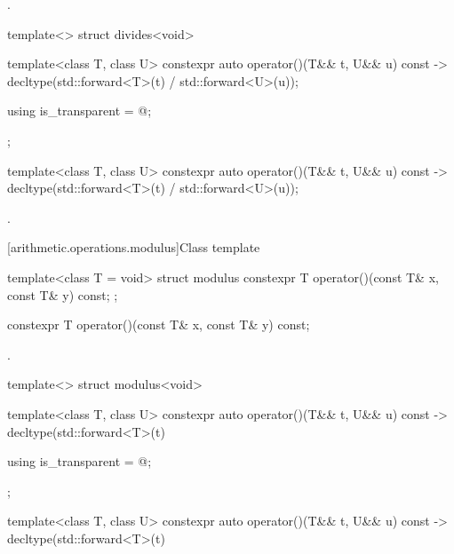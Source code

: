 \begin{itemdescr}
\pnum
\returns
{}.
\end{itemdescr}

%
\begin{itemdecl}
template<> struct divides<void> {
  template<class T, class U> constexpr auto operator()(T&& t, U&& u) const
    -> decltype(std::forward<T>(t) / std::forward<U>(u));

  using is_transparent = @\unspec@;
};
\end{itemdecl}

%
\begin{itemdecl}
template<class T, class U> constexpr auto operator()(T&& t, U&& u) const
  -> decltype(std::forward<T>(t) / std::forward<U>(u));
\end{itemdecl}

\begin{itemdescr}
\pnum
\returns
{}.
\end{itemdescr}

[arithmetic.operations.modulus]{Class template }

%
\begin{itemdecl}
template<class T = void> struct modulus {
  constexpr T operator()(const T& x, const T& y) const;
};
\end{itemdecl}

%
\begin{itemdecl}
constexpr T operator()(const T& x, const T& y) const;
\end{itemdecl}

\begin{itemdescr}
\pnum
\returns
{}.
\end{itemdescr}

%
\begin{itemdecl}
template<> struct modulus<void> {
  template<class T, class U> constexpr auto operator()(T&& t, U&& u) const
    -> decltype(std::forward<T>(t) %

  using is_transparent = @\unspec@;
};
\end{itemdecl}

%
\begin{itemdecl}
template<class T, class U> constexpr auto operator()(T&& t, U&& u) const
  -> decltype(std::forward<T>(t) %
\end{itemdecl}

